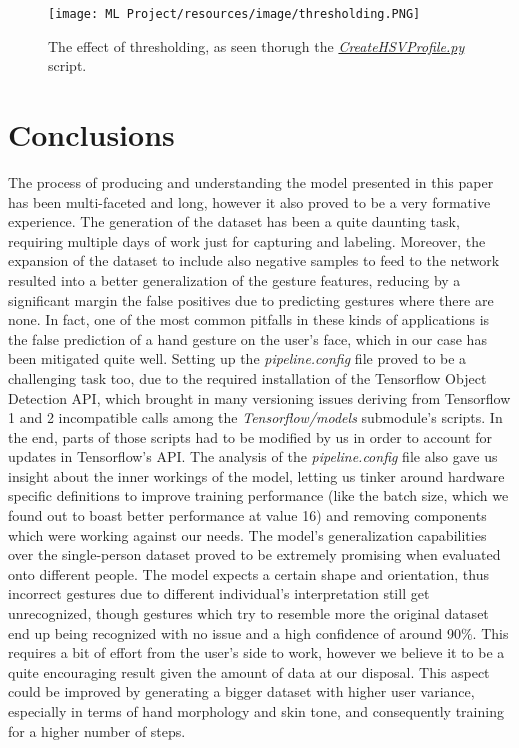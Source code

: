 \documentclass[a4paper, 12pt]{article}
\begin{document}
\begin{flushleft}
\begin{figure}[!h]
    \centering
    \texttt{[image: ML Project/resources/image/thresholding.PNG]} \caption{The effect of thresholding, as seen thorugh the \textit{\href{https://github.com/MarzioVallero/ML-Based-Blender-Gestural-Input-Interface/blob/master/CreateHSVProfile.py}{CreateHSVProfile.py}} script.}
\end{figure}
\label{figure6}

\end{flushleft}

\section{Conclusions}
\begin{flushleft}
The process of producing and understanding the model presented in this paper has been multi-faceted and long, however it also proved to be a very formative experience.\linebreak
The generation of the dataset has been a quite daunting task, requiring multiple days of work just for capturing and labeling. Moreover, the expansion of the dataset to include also negative samples to feed to the network resulted into a better generalization of the gesture features, reducing by a significant margin the false positives due to predicting gestures where there are none. In fact, one of the most common pitfalls in these kinds of applications is the false prediction of a hand gesture on the user's face, which in our case has been mitigated quite well.\linebreak
Setting up the \textit{pipeline.config} file proved to be a challenging task too, due to the required installation of the Tensorflow Object Detection API, which brought in many versioning issues deriving from Tensorflow 1 and 2 incompatible calls among the \textit{Tensorflow/models} submodule's scripts. In the end, parts of those scripts had to be modified by us in order to account for updates in Tensorflow's API.\linebreak
The analysis of the \textit{pipeline.config} file also gave us insight about the inner workings of the model, letting us tinker around hardware specific definitions to improve training performance (like the batch size, which we found out to boast better performance at value 16) and removing components which were working against our needs.\linebreak
The model's generalization capabilities over the single-person dataset proved to be extremely promising when evaluated onto different people. The model expects a certain shape and orientation, thus incorrect gestures due to different individual's interpretation still get unrecognized, though gestures which try to resemble more the original dataset end up being recognized with no issue and a high confidence of around 90\%. This requires a bit of effort from the user's side to work, however we believe it to be a quite encouraging result given the amount of data at our disposal. This aspect could be improved by generating a bigger dataset with higher user variance, especially in terms of hand morphology and skin tone, and consequently training for a higher number of steps.\linebreak

\end{flushleft}
\end{document}
